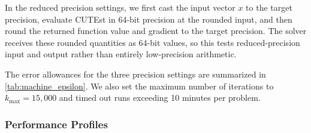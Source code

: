 \documentclass[journal_revised_MPC]{subfiles}
\begin{document}
In the reduced precision settings, we first cast the input vector $x$ to the target precision, evaluate CUTEst in 64-bit precision at the rounded input, and then round the returned function value and gradient to the target precision.
The solver receives these rounded quantities as 64-bit values, so this tests reduced-precision input and output rather than entirely low-precision arithmetic.

The error allowances for the three precision settings are summarized in \cref{tab:machine_epsilon}.
We also set the maximum number of iterations to $k_{\max} = 15{,}000$ and timed out runs exceeding 10 minutes per problem.



\subsubsection{Performance Profiles}\label{sssec:metrics}
\end{document}
